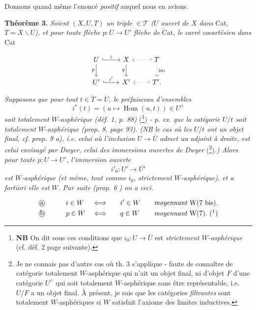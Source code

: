 \documentclass[11pt]{article}
\newcommand{\printedpage}[1]{\marginpar{\footnotesize p.~#1}}
\newcommand{\msp}[1]{\marginpar{\footnotesize [#1]}}
\begin{document}
Donnons quand même l'enoncé \textit{positif} auquel nous en avions. %

\textbf{Théorème 3.} \textit{Soient $(X,U,T)$ un triple $\in\mathcal{T}$ ($U$ ouvert de $X$ dans} Cat\textit{, $T=X\backslash U$), et pour toute flèche $p:U\longrightarrow U'$ flèche de} Cat\textit{, le carré cocartésien dans} Cat

\[
\begin{tikzcd}
U \arrow[r, hook, "i"] \arrow[d, "p"'] & X \arrow[d, "q"'] & T \arrow[l, dotted, hook'] \arrow[d, dotted, "\text{iso}"] \\
U' \arrow[r, hook, "i'"] & X' & T'. \arrow[l, dotted, hook']
\end{tikzcd}
\]

\printedpage{75}

\msp{page 108}

\textit{Supposons que pour tout $t\in\dot{T}=\dot{U}$, le préfaisceau d'ensembles}
\[ i^*(t)=(u\longmapsto\operatorname{Hom}(u,t))\in U^\wedge \]
\textit{soit totalement $W$-asphérique (déf. 1, p. 88)} (\footnote{\textbf{NB} On dit sous ces conditions que $i_0:U\longrightarrow\bar{U}$ est \textit{strictement $W$-asphérique} (cf. déf. 2 page suivante).}) \textit{- p. ex. que la catégorie $U/t$ soit totalement $W$-asphérique (prop. 8, page 93). (NB le cas où les $U/t$ ont un objet final, cf. prop. 9 a), i.e. celui où l'inclusion $U\longrightarrow\bar{U}$ admet un adjoint à droite, est celui envisagé par Dwyer, celui des immersions ouvertes de Dwyer} (\footnote{Je ne connais pas d'autre cas où th. 3 s'applique - faute de connaître de catégorie totalement $W$-asphérique qui n'ait un objet final, ni d'objet $F$ d'une catégorie $U^\wedge$ qui soit totalement $W$-asphérique sans être représentable, i.e. $U/F$ a un objet final. À présent, je sais que les catégories \textit{filtrantes} sont totalement $W$-asphériques si $W$ satisfait l'axiome des limites inductives.})\textit{.) Alors pour toute $p:U\longrightarrow U'$, l'immersion ouverte}
\[ i'_0:U'\longrightarrow\overline{U'} \]
\textit{est $W$-asphérique (et même, tout comme $i_0$, strictement $W$-asphérique), et a fortiori elle est} \textit{$W$. Par suite (prop. 6} \textit{) on a ceci.}

\[
\begin{aligned}
&\text{\textcircled{a}}\qquad && i\in W && \Longleftrightarrow\quad && i'\in W\quad && \textit{moyennant } \mathrm{W}(7\text{ bis}).\\
&\text{\textcircled{b}}\qquad && p\in W && \Longleftrightarrow\quad && q\in W\quad && \textit{moyennant } \mathrm{W}(7).\ (\footnotemark)
\end{aligned}
\]
\end{document}
